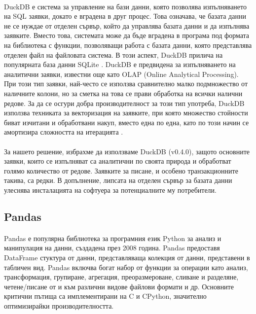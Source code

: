 \documentclass[pdftex,cyrillic,14pt,a4page,twoside,openright]{extreport}
\begin{document}
\paragraph{}
DuckDB \cite{raasveldt2019} е система за управление на бази данни, която позволява изпълняването на SQL заявки, докато е вградена в друг процес. Това означава, че базата данни не се нуждае от отделен сървър, който да управлява базата данни и да изпълнява заявките. Вместо това, системата може да бъде вградена в програма под формата на библиотека с функции, позволяващи работа с базата данни, която представлява отделен файл на файловата система. В този аспект, DuckDB прилича на популярната база данни SQLite \cite{sqlite2020hipp}. DuckDB е предвидена за изпълняването на аналитични заявки, известни още като OLAP (Online Analytical Processing). При този тип заявки, най-често се използва сравнително малко подмножество от наличните колони, но за сметка на това се прави обработка на всички налични редове. За да се осгури добра производителност за този тип употреба, DuckDB използва техниката за векторизация на заявките, при която множество стойности биват изчитани и обработвани накуп, вместо една по една, като по този начин се амортизира сложността на итерацията \cite{kersten2018}.

\paragraph{}
За нашето решение, избрахме да използваме DuckDB (v0.4.0), защото основните заявки, които се изпълняват са аналитични по своята природа и обработват голямо количество от редове. Заявките за писане, и особено транзакционните такива, са редки. В допълнение, липсата на отделен сървър за базата данни улеснява инсталацията на софтуера за потенциалните му потребители.

\subsection{Pandas}
\paragraph{}
Pandas \cite{reback2020pandas} е популярна библиотека за програмния език Python за анализ и манипулация на данни, създадена през 2008 година. Pandas предоставя DataFrame стуктура от данни, представляваща колекция от данни, представени в табличен вид. Pandas включва богат набор от функции за операции като анализ, трансформация, групиране, агрегация, преоразмероване, сливане и разделяне, четене/писане от и към различни видове файлови формати и др. Основните критични пътища са имплементирани на C и CPython, значително оптимизирайки производителността.
\end{document}
